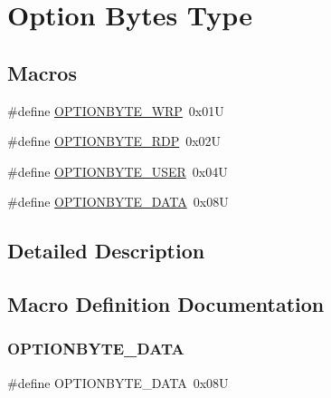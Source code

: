 \hypertarget{group___f_l_a_s_h_ex___o_b___type}{}\section{Option Bytes Type}
\label{group___f_l_a_s_h_ex___o_b___type}
\subsection*{Macros}
\begin{DoxyCompactItemize}
\item 
\#define \hyperlink{group___f_l_a_s_h_ex___o_b___type_ga48712a166ea192ddcda0f2653679f9ec}{O\+P\+T\+I\+O\+N\+B\+Y\+T\+E\+\_\+\+W\+RP}~0x01U
\item 
\#define \hyperlink{group___f_l_a_s_h_ex___o_b___type_ga8f0bdb21ef13bae39d5d8b6619e2df06}{O\+P\+T\+I\+O\+N\+B\+Y\+T\+E\+\_\+\+R\+DP}~0x02U
\item 
\#define \hyperlink{group___f_l_a_s_h_ex___o_b___type_gac7d843e666e15c79688a1914e8ffe7a5}{O\+P\+T\+I\+O\+N\+B\+Y\+T\+E\+\_\+\+U\+S\+ER}~0x04U
\item 
\#define \hyperlink{group___f_l_a_s_h_ex___o_b___type_gad0c29c84acfb46de1708a670529175a5}{O\+P\+T\+I\+O\+N\+B\+Y\+T\+E\+\_\+\+D\+A\+TA}~0x08U
\end{DoxyCompactItemize}


\subsection{Detailed Description}


\subsection{Macro Definition Documentation}
\mbox{\label{group___f_l_a_s_h_ex___o_b___type_gad0c29c84acfb46de1708a670529175a5}} 
\subsubsection{\texorpdfstring{O\+P\+T\+I\+O\+N\+B\+Y\+T\+E\+\_\+\+D\+A\+TA}{OPTIONBYTE\_DATA}}
{\footnotesize\ttfamily \#define O\+P\+T\+I\+O\+N\+B\+Y\+T\+E\+\_\+\+D\+A\+TA~0x08U}


